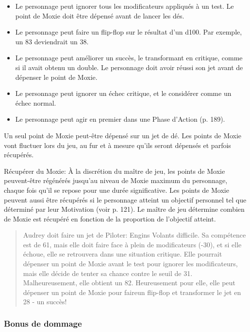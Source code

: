 \begin{itemize} \item Le personnage peut ignorer tous les modificateurs appliqués à un test. Le point de Moxie doit être dépensé avant de lancer les dés. \item Le personnage peut faire un flip-flop sur le résultat d'un d100. Par exemple, un 83 deviendrait un 38. \item Le personnage peut améliorer un succès, le transformant en critique, comme si il avait obtenu un double. Le personnage doit avoir réussi son jet avant de dépenser le point de Moxie. \item Le personnage peut ignorer un échec critique, et le considérer comme un échec normal. \item Le personnage peut agir en premier dans une Phase d'Action (p. 189). \end{itemize} 

Un seul point de Moxie peut-être dépensé sur un jet de dé. Les points de Moxie vont fluctuer lors du jeu, au fur et à mesure qu'ils seront dépensés et parfois récupérés. 

Récupérer du Moxie: À la discrétion du maître de jeu, les points de Moxie peuvent-être régénérés jusqu'au niveau de Moxie maximum du personnage, chaque fois qu'il se repose pour une durée significative. Les points de Moxie peuvent aussi être récupérés si le personnage atteint un objectif personnel tel que déterminé par leur Motivation (voir p. 121). Le maître de jeu détermine combien de Moxie est récupéré en fonction de la proportion de l'objectif atteint. 

\begin{quotation} Audrey doit faire un jet de Piloter: Engins Volants difficile. Sa compétence est de 61, mais elle doit faire face à plein de modificateurs (-30), et si elle échoue, elle se retrouvera dans une situation critique. Elle pourrait dépenser un point de Moxie avant le test pour ignorer les modificateurs, mais elle décide de tenter sa chance contre le seuil de 31. Malheureusement, elle obtient un 82. Heureusement pour elle, elle peut dépenser un point de Moxie pour faireun flip-flop et transformer le jet en 28 - un succès! \end{quotation} 

\subsubsection{Bonus de dommage} \label{sec:damage-bonus} 

